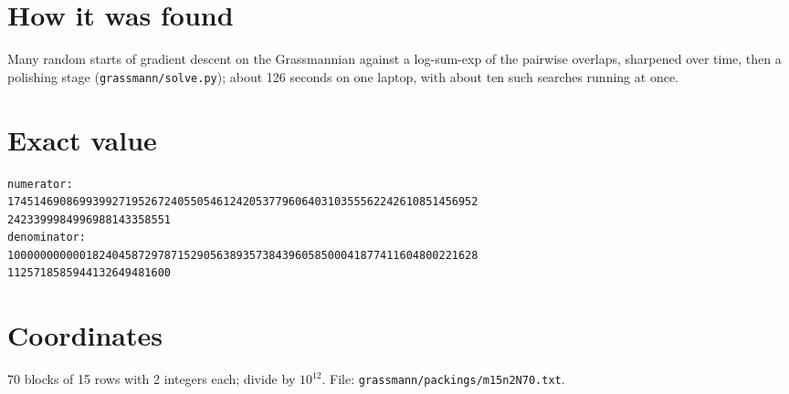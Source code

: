 \documentclass[11pt,a4paper]{article}
\begin{document}
\section{How it was found}
Many random starts of gradient descent on the Grassmannian against a log-sum-exp of the pairwise overlaps, sharpened over time, then a polishing stage (\texttt{grassmann/solve.py}); about 126 seconds on one laptop, with about ten such searches running at once.


\appendix
\section{Exact value}
{\small
\begin{verbatim}
numerator:
174514690869939927195267240550546124205377960640310355562242610851456952
2423399984996988143358551
denominator:
100000000000182404587297871529056389357384396058500041877411604800221628
1125718585944132649481600
\end{verbatim}}

\section{Coordinates}
70 blocks of 15 rows with 2 integers each; divide by $10^{12}$. File: \texttt{grassmann/packings/m15n2N70.txt}.
{\tiny
\begin{multicols}{4}
\end{multicols}}
\end{document}
